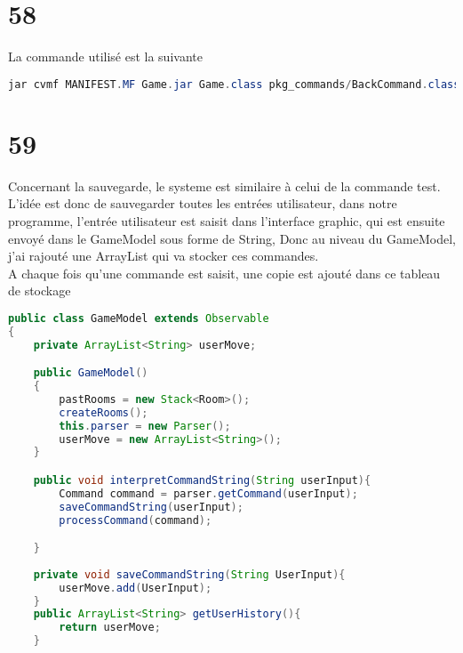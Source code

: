 \documentclass[a4paper , 10pt]{article}
\begin{document}
\section{58}
La commande utilisé est la suivante
\begin{lstlisting}[language=Java, caption={Make jar}]
jar cvmf MANIFEST.MF Game.jar Game.class pkg_commands/BackCommand.class pkg_commands/BeamCommand.class pkg_commands/DropCommand.class pkg_commands/EatCommand.class pkg_commands/GoCommand.class pkg_commands/HelpCommand.class pkg_commands/LookCommand.class pkg_commands/MineCommand.class pkg_commands/QuitCommand.class pkg_commands/TakeCommand.class pkg_commands/TestCommand.class pkg_data/Item.class pkg_data/Player.class pkg_data/Room.class pkg_mainStruct/GameModel.class pkg_mainStruct/GameView.class pkg_mainStruct/UserInterface\$1.class pkg_mainStruct/UserInterface.class pkg_tools/Command.class pkg_tools/CommandWord.class pkg_tools/CommandWords.class pkg_tools/Parser.class pkg_tools/RoomFileReader.class img/* cmd.txt explore_all.txt RoomData.csv ideal_run.txt 

\end{lstlisting}

\section{59}
Concernant la sauvegarde, le systeme est similaire à celui de la commande test. 
L'idée est donc de sauvegarder toutes les entrées utilisateur, dans notre programme, l'entrée utilisateur 
est saisit dans l'interface graphic, qui est ensuite envoyé dans le GameModel sous forme de String, 
Donc au niveau du GameModel, j'ai rajouté une ArrayList qui va stocker ces commandes.\\
A chaque fois qu'une commande est saisit, une copie est ajouté dans ce tableau de stockage

\begin{lstlisting}[language=Java, caption={GameModel}]
public class GameModel extends Observable
{
    private ArrayList<String> userMove;

    public GameModel()
    {
        pastRooms = new Stack<Room>();
        createRooms();
        this.parser = new Parser();
        userMove = new ArrayList<String>();
    }

    public void interpretCommandString(String userInput){
        Command command = parser.getCommand(userInput);
        saveCommandString(userInput);
        processCommand(command);

    }
    
    private void saveCommandString(String UserInput){
        userMove.add(UserInput);
    }
    public ArrayList<String> getUserHistory(){
        return userMove;
    }
\end{lstlisting}
\end{document}
